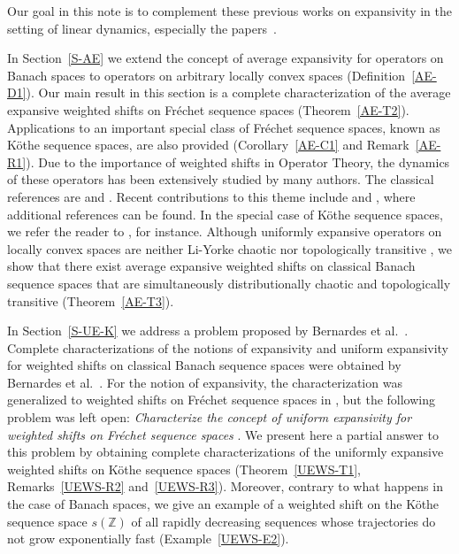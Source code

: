 \documentclass[12pt]{amsart}
\theoremstyle{theorem}
\theoremstyle{definition}
\theoremstyle{remark} \theoremstyle{question} \theoremstyle{example}
\newcommand{\Z}{\mathbb{Z}}   %
\begin{document}
Our goal in this note is to complement these previous works on expansivity in the setting of linear dynamics, 
especially the papers~\cite{AlvBerMes21,BCDFP,BerCirDarMesPuj18}.

In Section~\ref{S-AE} we extend the concept of average expansivity for operators on Banach spaces \cite{AlvBerMes21} 
to operators on arbitrary locally convex spaces (Definition~\ref{AE-D1}).
Our main result in this section is a complete characterization of the average expansive weighted shifts 
on Fr\'echet sequence spaces (Theorem~\ref{AE-T2}).
Applications to an important special class of Fr\'echet sequence spaces, 
known as K\"othe sequence spaces, are also provided (Corollary~\ref{AE-C1} and Remark~\ref{AE-R1}). 
Due to the importance of weighted shifts in Operator Theory, 
the dynamics of these operators has been extensively studied by many authors.
The classical references are \cite{KGro00} and \cite{HSal95}.
Recent contributions to this theme include \cite{NBerAMes21} and \cite{NBerAPer2024}, where additional references can be found.
In the special case of K\"othe sequence spaces, we refer the reader to \cite{BCDFP,NBerAPer2024,NBerFVas25,FMarAPer02,XWuPZhu13},
for instance.
Although uniformly expansive operators on locally convex spaces are neither Li-Yorke chaotic nor topologically transitive
\cite{BCDFP}, we show that there exist average expansive weighted shifts on classical Banach sequence spaces
that are simultaneously distributionally chaotic and topologically transitive (Theorem~\ref{AE-T3}).

In Section~\ref{S-UE-K} we address a problem proposed by Bernardes et al.\ \cite{BCDFP}.
Complete characterizations of the notions of expansivity and uniform expansivity for weighted shifts
on classical Banach sequence spaces were obtained by Bernardes et al.\ \cite{BerCirDarMesPuj18}.
For the notion of expansivity, the characterization was generalized to weighted shifts on Fr\'echet sequence spaces in \cite{BCDFP},
but the following problem was left open:
{\it Characterize the concept of uniform expansivity for weighted shifts on Fr\'echet sequence spaces} \cite[Problem~E]{BCDFP}.
We present here a partial answer to this problem by obtaining complete characterizations of the uniformly expansive
weighted shifts on K\"othe sequence spaces (Theorem~\ref{UEWS-T1}, Remarks~\ref{UEWS-R2} and~\ref{UEWS-R3}).
Moreover, contrary to what happens in the case of Banach spaces, we give an example of a weighted shift on the K\"othe sequence space
$s(\Z)$ of all rapidly decreasing sequences whose trajectories do not grow exponentially fast (Example~\ref{UEWS-E2}).
\end{document}
